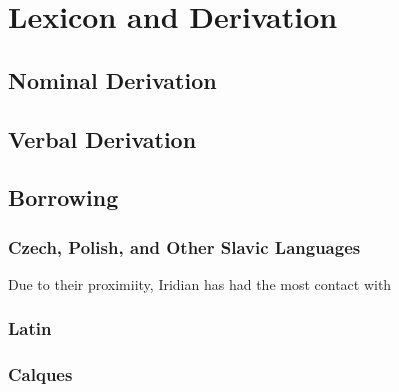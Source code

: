 \chapter{Lexicon and Derivation}

\section{Nominal Derivation}
\section{Verbal Derivation}
\section{Borrowing}
\subsection{Czech, Polish, and Other Slavic Languages}
Due to their proximiity, Iridian has had the most contact with

\subsection{Latin}

\subsection{Calques}\label{sec:calques}
